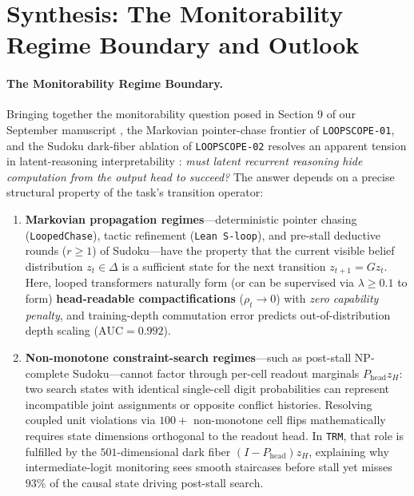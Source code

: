 \documentclass[10pt,letterpaper]{article}
\newcommand{\Phead}{P_{\mathrm{head}}}
\begin{document}
\section{Synthesis: The Monitorability Regime Boundary and Outlook}\label{sec:discussion}

\paragraph{The Monitorability Regime Boundary.} Bringing together the monitorability question posed in Section 9 of our September manuscript \cite{dugan2026vpd}, the Markovian pointer-chase frontier of \texttt{LOOPSCOPE-01}, and the Sudoku dark-fiber ablation of \texttt{LOOPSCOPE-02} resolves an apparent tension in latent-reasoning interpretability \cite{olszowiec2026monitoring,sesodia2026inside}: \emph{must latent recurrent reasoning hide computation from the output head to succeed?} The answer depends on a precise structural property of the task's transition operator:
\begin{enumerate}[topsep=3pt,itemsep=2pt]
  \item \textbf{Markovian propagation regimes}—deterministic pointer chasing (\texttt{LoopedChase}), tactic refinement (\texttt{Lean S-loop}), and pre-stall deductive rounds ($r\ge 1$) of Sudoku—have the property that the current visible belief distribution $z_t \in \Delta$ is a sufficient state for the next transition $z_{t+1} = G z_t$. Here, looped transformers naturally form (or can be supervised via $\lambda \ge 0.1$ to form) \textbf{head-readable compactifications} ($\rho_t \to 0$) with \emph{zero capability penalty}, and training-depth commutation error predicts out-of-distribution depth scaling ($\mathrm{AUC}=0.992$).
  \item \textbf{Non-monotone constraint-search regimes}—such as post-stall NP-complete Sudoku—cannot factor through per-cell readout marginals $\Phead z_H$: two search states with identical single-cell digit probabilities can represent incompatible joint assignments or opposite conflict histories. Resolving coupled unit violations via $100+$ non-monotone cell flips mathematically requires state dimensions orthogonal to the readout head. In \texttt{TRM}, that role is fulfilled by the $501$-dimensional dark fiber $(I-\Phead)z_H$, explaining why intermediate-logit monitoring sees smooth staircases before stall yet misses $93\%$ of the causal state driving post-stall search.
\end{enumerate}
\end{document}
